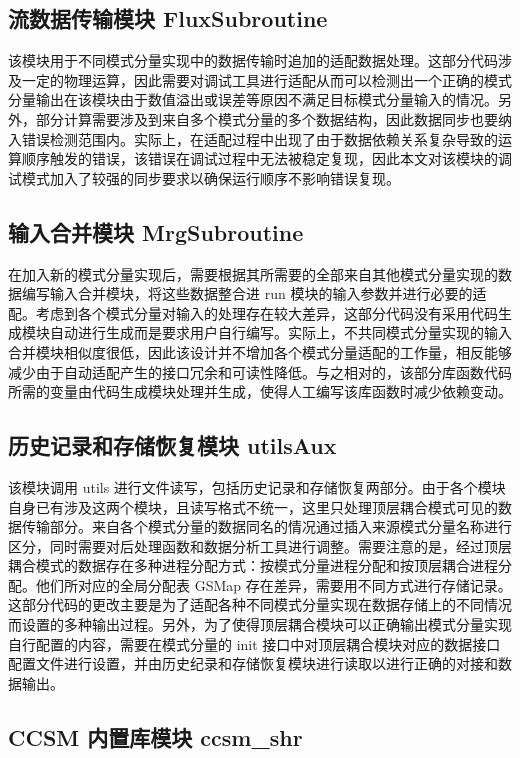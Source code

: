 \subsection{流数据传输模块 FluxSubroutine}

该模块用于不同模式分量实现中的数据传输时追加的适配数据处理。这部分代码涉及一定的物理运算，因此需要对调试工具进行适配从而可以检测出一个正确的模式分量输出在该模块由于数值溢出或误差等原因不满足目标模式分量输入的情况。另外，部分计算需要涉及到来自多个模式分量的多个数据结构，因此数据同步也要纳入错误检测范围内。实际上，在适配过程中出现了由于数据依赖关系复杂导致的运算顺序触发的错误，该错误在调试过程中无法被稳定复现，因此本文对该模块的调试模式加入了较强的同步要求以确保运行顺序不影响错误复现。

\subsection{输入合并模块 MrgSubroutine}

在加入新的模式分量实现后，需要根据其所需要的全部来自其他模式分量实现的数据编写输入合并模块，将这些数据整合进 run 模块的输入参数并进行必要的适配。考虑到各个模式分量对输入的处理存在较大差异，这部分代码没有采用代码生成模块自动进行生成而是要求用户自行编写。实际上，不共同模式分量实现的输入合并模块相似度很低，因此该设计并不增加各个模式分量适配的工作量，相反能够减少由于自动适配产生的接口冗余和可读性降低。与之相对的，该部分库函数代码所需的变量由代码生成模块处理并生成，使得人工编写该库函数时减少依赖变动。

\subsection{历史记录和存储恢复模块 utilsAux}

该模块调用 utils 进行文件读写，包括历史记录和存储恢复两部分。由于各个模块自身已有涉及这两个模块，且读写格式不统一，这里只处理顶层耦合模式可见的数据传输部分。来自各个模式分量的数据同名的情况通过插入来源模式分量名称进行区分，同时需要对后处理函数和数据分析工具进行调整。需要注意的是，经过顶层耦合模式的数据存在多种进程分配方式：按模式分量进程分配和按顶层耦合进程分配。他们所对应的全局分配表 GSMap 存在差异，需要用不同方式进行存储记录。这部分代码的更改主要是为了适配各种不同模式分量实现在数据存储上的不同情况而设置的多种输出过程。另外，为了使得顶层耦合模块可以正确输出模式分量实现自行配置的内容，需要在模式分量的 init 接口中对顶层耦合模块对应的数据接口配置文件进行设置，并由历史纪录和存储恢复模块进行读取以进行正确的对接和数据输出。

\subsection{CCSM 内置库模块 ccsm\_shr}

